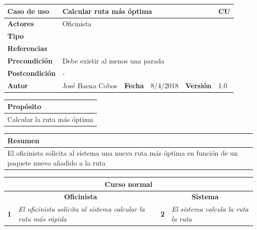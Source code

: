 \documentclass[12pt,spanish]{article}
\begin{document}
\begin{table}[H]
	\centering
	\begin{tabular}{|m{3cm}|m{4cm}|m{2cm}|m{2cm}|m{2cm}|m{1cm}|}
		\hline
		\textbf{Caso de uso} &  \multicolumn{4}{m{11cm}|}{Calcular ruta más óptima} \vline &  \cellcolor{gray!40}CU\arabic{contadorCU}  \stepcounter{contadorCU} \\
		\hline
		\textbf{Actores} & \multicolumn{5}{m{11cm}|}{Oficinista} \\
		\hline
		\textbf{Tipo} & \multicolumn{5}{m{11cm}|}{} \\
		\hline
		\textbf{Referencias} &\multicolumn{5}{m{11cm}|}{} \\
		\hline
		\textbf{Precondición} & \multicolumn{5}{m{11cm}|}{Debe existir al menos una parada} \\
		\hline
		\textbf{Postcondición} & \multicolumn{5}{m{11cm}|}{-} \\
		\hline
		\textbf{Autor} & José Baena Cobos & \textbf{Fecha} & 8/4/2018 & \textbf{Versión} & 1.0 \\
		\hline
	\end{tabular}
	
	\vspace{1cm}
	
	\begin{tabular}{|m{16.2cm}|}
		\hline
		\textbf{Propósito} \\
		\hline
		Calcular la ruta más óptima\\
		\hline
	\end{tabular}
	
	\vspace{1cm}
	
	\begin{tabular}{|m{16.2cm}|}
		\hline
		\textbf{Resumen} \\
		\hline
		El oficinista solicita al sistema una nueva ruta más óptima en función de un paquete nuevo añadido a la ruta\\
		\hline
	\end{tabular}
	
	\vspace{1cm}
	
	\begin{tabular}{|m{5pt}|m{7.33cm}|m{5pt}|m{7.33cm}|}
		\hline
		\multicolumn{4}{|c|}{\textbf{Curso normal}} \\
		\hline
		\multicolumn{2}{|c}{\textbf{Oficinista}} & \multicolumn{2}{|c|}{\textbf{Sistema}} \\
		\hline
		\textbf{1} & \textit{El oficinista solicita al sistema calcular la ruta más rápida} & \textbf{2} & \textit{El sistema calcula la ruta la ruta} \\
		\hline
	

\end{tabular}
\end{table}
\end{document}
